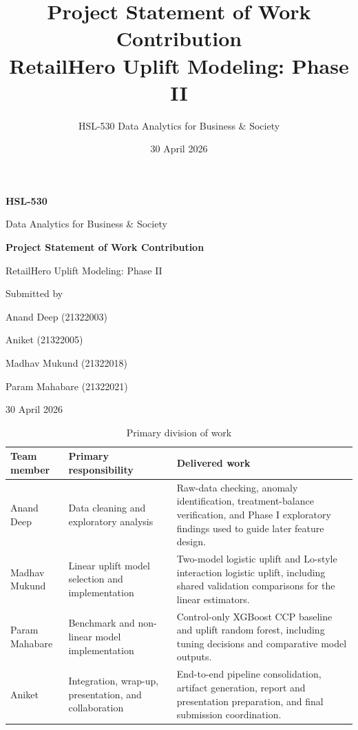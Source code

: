 \documentclass[11pt,a4paper]{article}
\title{Project Statement of Work Contribution\\RetailHero Uplift Modeling: Phase II}
\author{HSL-530 Data Analytics for Business \& Society}
\date{30 April 2026}
\begin{document}
\hypersetup{pageanchor=false}
\begin{titlepage}
\centering
{\Large \textbf{HSL-530}\par}
\vspace{0.25cm}
{\large Data Analytics for Business \& Society\par}

\vspace{2cm}
{\Huge \textbf{Project Statement of Work Contribution}\par}
\vspace{0.6cm}
{\LARGE RetailHero Uplift Modeling: Phase II\par}

\vspace{1.6cm}
{\large Submitted by\par}
\vspace{0.4cm}
{\large Anand Deep (21322003)\par}
{\large Aniket (21322005)\par}
{\large Madhav Mukund (21322018)\par}
{\large Param Mahabare (21322021)\par}

\vfill
{\large 30 April 2026\par}
\end{titlepage}
\hypersetup{pageanchor=true}

\begin{table}[h]
\centering
\caption{Primary division of work}
\begin{tabular}{L{0.20\textwidth} L{0.29\textwidth} L{0.39\textwidth}}
\toprule
\textbf{Team member} & \textbf{Primary responsibility} & \textbf{Delivered work} \\
\midrule
Anand Deep & Data cleaning and exploratory analysis & Raw-data checking, anomaly identification, treatment-balance verification, and Phase I exploratory findings used to guide later feature design. \\
Madhav Mukund & Linear uplift model selection and implementation & Two-model logistic uplift and Lo-style interaction logistic uplift, including shared validation comparisons for the linear estimators. \\
Param Mahabare & Benchmark and non-linear model implementation & Control-only XGBoost CCP baseline and uplift random forest, including tuning decisions and comparative model outputs. \\
Aniket & Integration, wrap-up, presentation, and collaboration & End-to-end pipeline consolidation, artifact generation, report and presentation preparation, and final submission coordination. \\
\bottomrule
\end{tabular}
\end{table}
\end{document}

